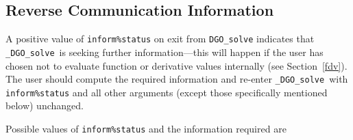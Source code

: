 \documentclass{galahad}
\newcommand{\packagename}{DGO}
\newcommand{\fullpackagename}{\libraryname\_\packagename}
\newcommand{\solver}{{\tt \fullpackagename\_solve}}
\begin{document}

\subsection{\label{reverse}Reverse Communication Information}

A positive value of {\tt inform\%status} on exit from
{\tt \packagename\_solve}
indicates that
\solver\ is seeking further information---this will happen
if the user has chosen not to evaluate function or
derivative values internally (see Section~\ref{fdv}).
The user should compute the required information and re-enter \solver\
with {\tt inform\%status} and all other arguments (except those specifically
mentioned below) unchanged.

Possible values of {\tt inform\%status} and the information required are
\end{document}
